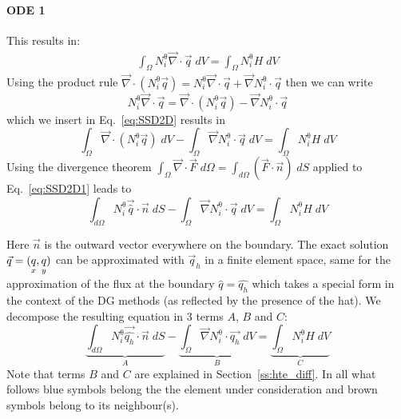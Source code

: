 \paragraph{ODE 1} This results in:
\begin{eqnarray}
\int_\Omega {N^\uptheta_i} \vec{\nabla} \cdot \vec{q} \; dV = \int_\Omega {N^\uptheta_i} H \; dV
\label{eq:SSD2D}
\end{eqnarray}
Using the product rule $\vec{\nabla} \cdot ({N^\uptheta_i}\vec{q})={N^\uptheta_i}\vec{\nabla} \cdot \vec{q} 
+ \vec{\nabla}{N^\uptheta_i} \cdot \vec{q}$ then we can write
\[ 
{N^\uptheta_i}\vec{\nabla} \cdot \vec{q}=\vec{\nabla} \cdot ({N^\uptheta_i}\vec{q})- 
\vec{\nabla}{N^\uptheta_i} \cdot \vec{q}
\]
which we insert in Eq.~\eqref{eq:SSD2D} results in 
\begin{equation}
\int_{\Omega} \vec{\nabla} \cdot ({N^\uptheta_i} \vec{q}) \; dV - 
\int_{\Omega} \vec{\nabla} {N^\uptheta_i} \cdot \vec{q} \; dV = \int_{\Omega} {N^\uptheta_i} H \; dV
\label{eq:SSD2D1}
\end{equation}
Using the divergence theorem 
$\int_\Omega \vec{\nabla} \cdot \vec{F} \; d\Omega = \int_{d\Omega}(\vec{F} \cdot \vec{n}) \; dS$ 
 applied to Eq.~\eqref{eq:SSD2D1} leads to
\begin{equation}
\int_{d\Omega}{N^\uptheta_i} \vec{\hat{q}} \cdot \vec{n} \; dS  - 
\int_{\Omega} \vec{\nabla} {N^\uptheta_i} \cdot \vec{q} \; dV = 
\int_{\Omega} {N^\uptheta_i} H  \; dV
\end{equation}

Here $\vec{n}$ is the outward vector everywhere on the boundary. 
The exact solution $\vec{q}=(\underset{\tiny x}{q},\underset{\tiny y}{q})$ can be approximated with $\vec{q}_h$ in a  
finite element space, same for the approximation of the flux at the boundary $\hat{q}=\hat{q_h}$ 
which takes a special form in the context of the DG methods (as reflected by the presence of the hat).
We decompose the resulting equation in 3 terms $A$, $B$ and $C$:
\begin{equation}
\underbrace{ \int_{d\Omega}{N^\uptheta_i} \vec{\hat{q_h}} \cdot \vec{n} \; dS}_{A } - 
\underbrace{ \int_{\Omega} \vec{\nabla} {N^\uptheta_i} \cdot \vec{q_h} \; dV}_{B} = 
\underbrace{\int_{\Omega} {N^\uptheta_i} H  \;dV }_C
\label{eq:q2dss}
\end{equation}
Note that terms $B$ and $C$ are explained in Section~\ref{ss:hte_diff}.
In all what follows blue symbols belong the the element under consideration 
and brown symbols belong to its neighbour(s).

